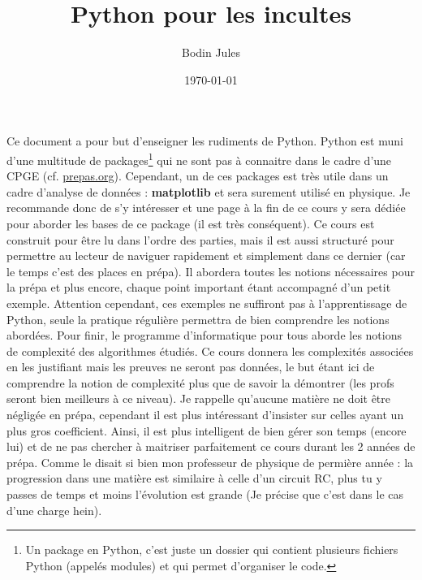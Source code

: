 \documentclass[a4paper,12pt]{article}
\title{Python pour les incultes}
\author{Bodin Jules}
\date{\today}
\begin{document}
\maketitle

\newpage

Ce document a pour but d'enseigner les rudiments de Python. Python est muni d'une multitude de packages\footnote{Un package en Python, 
c’est juste un dossier qui contient plusieurs fichiers Python (appelés modules) et qui permet d’organiser le code. 
} qui ne sont pas à connaitre dans le cadre d'une CPGE (cf. \href{https://prepas.org/ups.php?rubrique=53}{prepas.org}). 
Cependant, un de ces packages est très utile dans un cadre d'analyse de données : \textbf{matplotlib} et sera surement utilisé en physique. 
Je recommande donc de s'y intéresser et une page à la fin de ce cours y sera dédiée pour aborder les bases de ce package 
(il est très conséquent). \newline
\newline
Ce cours est construit pour être lu dans l'ordre des parties, mais il est aussi structuré pour permettre au lecteur de naviguer rapidement
et simplement dans ce dernier (car le temps c'est des places en prépa).
Il abordera toutes les notions nécessaires pour la prépa et plus encore, chaque point important étant accompagné d'un petit exemple. Attention cependant,
ces exemples ne suffiront pas à l'apprentissage de Python, seule la pratique régulière permettra de bien comprendre les notions abordées. \newline
\newline
Pour finir, le programme d'informatique pour tous aborde les notions de complexité des algorithmes étudiés. Ce cours donnera les complexités associées en les 
justifiant mais les preuves ne seront pas données, le but étant ici de comprendre la notion de complexité plus que de savoir la démontrer
(les profs seront bien meilleurs à ce niveau). \newline
\newline 
Je rappelle qu'aucune matière ne doit être négligée en prépa, cependant il est plus intéressant d'insister sur celles ayant un plus gros coefficient. 
Ainsi, il est plus intelligent de bien gérer son temps (encore lui) et de ne pas chercher à maitriser parfaitement ce cours durant les 2 années de prépa. 
Comme le disait si bien mon professeur de physique de permière année : la progression dans une matière est similaire à celle d'un circuit RC,
plus tu y passes de temps et moins l'évolution est grande (Je précise que c'est dans le cas d'une charge hein). \newline
\end{document}
